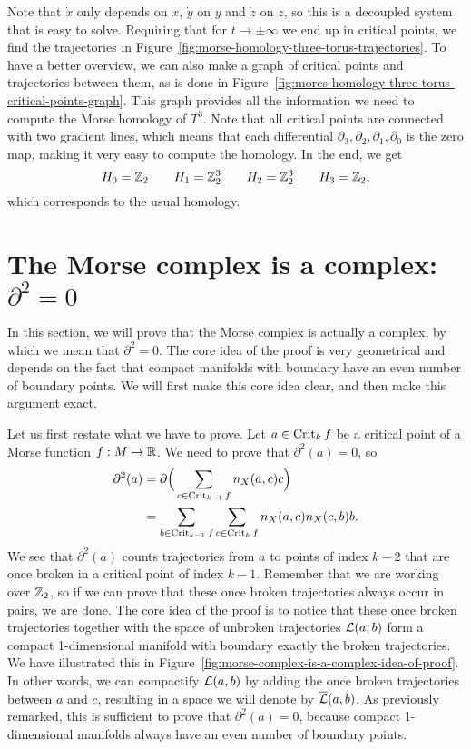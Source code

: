 \begin{eg}
    Note that $\dot x$ only depends on  $x$,  $\dot y$ on  $y$ and  $\dot z$ on $z$, so this is a decoupled system that is easy to solve.
    Requiring that for $t \to  \pm\infty$ we end up in critical points, we find the trajectories in Figure~\ref{fig:morse-homology-three-torus-trajectories}.
    To have a better overview, we can also make a graph of critical points and trajectories between them, as is done in Figure~\ref{fig:mores-homology-three-torus-critical-points-graph}.
    This graph provides all the information we need to compute the Morse homology of $T^{3}$.
    Note that all critical points are connected with two gradient lines, which means that each differential $\partial_3, \partial_{2}, \partial_1, \partial_0$ is the zero map, making it very easy to compute the homology. In the end, we get
    \[
    H_0 = \mathbb{Z}_2 \qquad 
    H_1 = \mathbb{Z}_2^3 \qquad 
    H_2 = \mathbb{Z}_2^3 \qquad 
    H_3 = \mathbb{Z}_2
    ,\] 
    which corresponds to the usual homology.
\end{eg}

\section{The Morse complex is a complex: $\partial^2 = 0$}
In this section, we will prove that the Morse complex is actually a complex, by which we mean that $\partial^2 = 0$.
The core idea of the proof is very geometrical and depends on the fact that compact manifolds with boundary have an even number of boundary points.
We will first make this core idea clear, and then make this argument exact.

Let us first restate what we have to prove. Let $a \in \operatorname{Crit}_k f$ be a critical point of a Morse function $f: M \to  \mathbb{R}$.
We need to prove that $\partial^2(a) = 0$, so
\begin{align*}
    \partial^2(a) &= \partial \Big(\sum_{c \in \operatorname{Crit}_{k-1} f} n_X(a, c) c\Big)\\
                  &= \sum_{b \in \operatorname{Crit}_{k-1} f} \sum_{c \in \operatorname{Crit}_k f} n_X(a, c) n_X(c, b) b
.\end{align*} 
We see that $\partial^2(a)$ counts trajectories from $a$ to points of index $k-2$ that are once broken in a critical point of index $k-1$.
Remember that we are working over $\mathbb{Z}_2$, so if we can prove that these once broken trajectories always occur in pairs, we are done.
The core idea of the proof is to notice that these once broken trajectories together with the space of unbroken trajectories $\mathcal L(a, b)$ form a compact 1-dimensional manifold with boundary exactly the broken trajectories. We have illustrated this in Figure~\ref{fig:morse-complex-is-a-complex-idea-of-proof}.
In other words, we can compactify $\mathcal L(a, b)$ by adding the once broken trajectories between $a$ and $c$, resulting in a space we will denote by $\overline{\mathcal L}(a, b)$.
As previously remarked, this is sufficient to prove that $\partial^2(a) = 0$, because compact 1-dimensional manifolds always have an even number of boundary points.

